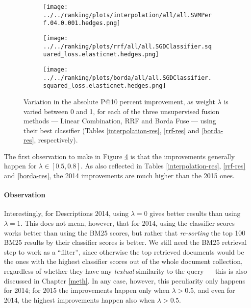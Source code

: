 \begin{figure}[h!]

\begin{subfigure}[b]{\textwidth}
 \centerline {
  \texttt{[image: ../../ranking/plots/interpolation/all/all.SVMPerf.04.0.001.hedges.png]}
  }
  \label{interp-weight}
\end{subfigure}
\begin{subfigure}[b]{\textwidth}
\centerline{
  \texttt{[image: ../../ranking/plots/rrf/all/all.SGDClassifier.squared\_loss.elasticnet.hedges.png]}
  }
  \label{rrf-weight}
\end{subfigure}
\begin{subfigure}[b]{\textwidth}
\centerline{
  \texttt{[image: ../../ranking/plots/borda/all/all.SGDClassifier.squared\_loss.elasticnet.hedges.png]}
  }
  \label{borda-weight}
\end{subfigure}

 \caption{Variation in the absolute P@10 percent improvement, as weight $\lambda$ is varied between 0 and 1, for each of the three unsupervised
fusion methods --- Linear Combination, RRF and Borda Fuse --- using their best classifier (Tables \ref{interpolation-res}, \ref{rrf-res}
and \ref{borda-res}, respectively).}
 \label{lambda-vary}

\end{figure}

The first observation to make in Figure \ref{lambda-vary} is that the improvements generally happen for $\lambda \in [0.5, 0.8]$.
As also reflected in Tables \ref{interpolation-res}, \ref{rrf-res} and \ref{borda-res}, the 2014 improvements are much higher than
the 2015 ones.

\paragraph{Observation} Interestingly, for Descriptions 2014, using $\lambda = 0$ gives better results
than using $\lambda=1$. This does not mean, however, that for 2014, using the classifier scores
works better than using the BM25 scores, but rather that
\emph{re-sorting} the top 100 BM25 results by their classifier scores is better.
We still need the BM25 retrieval step to work as a ``filter'',
since otherwise the top retrieved documents would be the ones with the highest classifier scores out of the whole document collection,
regardless of whether
they have any \emph{textual} similarity to the query --- this is also discussed in Chapter \ref{meth}.
In any case,  however, this peculiarity only happens for 2014; for 2015 the improvements happen only when $\lambda>0.5$,
and even for 2014, the highest improvements happen also when $\lambda>0.5$.

